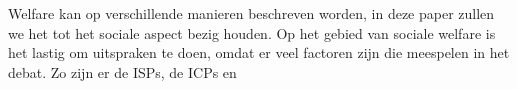Welfare kan op verschillende manieren beschreven worden, in deze paper zullen we het tot het sociale aspect bezig houden. Op het gebied van sociale welfare is het lastig om uitspraken te doen, omdat er veel factoren zijn die meespelen in het debat. Zo zijn er de \acp{ISP}, de \acp{ICP} en 